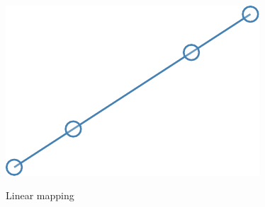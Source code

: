\begin{figure}[H]
		\\[0.5em]
		\includegraphics[]{images/results/terrains/512-1/blending/linear_spline.pdf}
		\caption{Linear mapping}
		\label{fig:ex-linear-surface}
	\end{figure}
	
